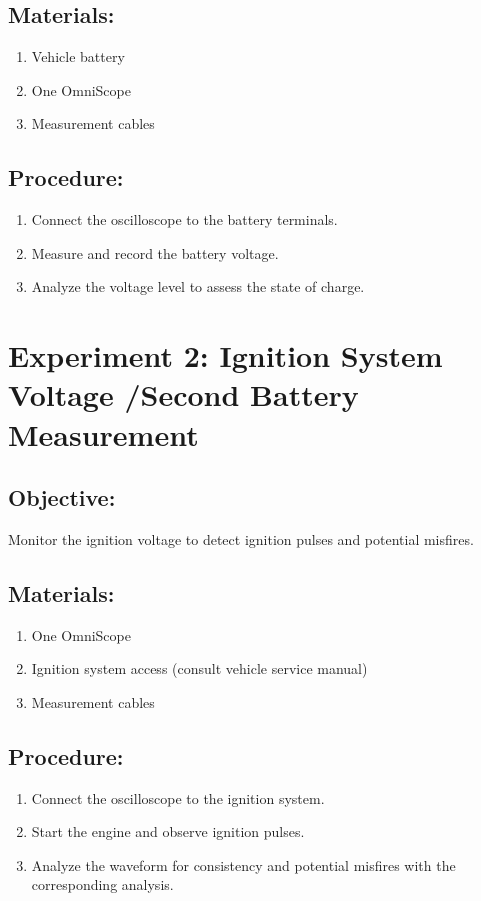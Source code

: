 \documentclass{scrreprt}
\begin{document}
\subsection*{Materials:}
\begin{enumerate}
    \item Vehicle battery
    \item One OmniScope
    \item Measurement cables
\end{enumerate}
\subsection*{Procedure:}
\begin{enumerate}
    \item Connect the oscilloscope to the battery terminals.
    \item Measure and record the battery voltage.
    \item Analyze the voltage level to assess the state of charge.
\end{enumerate}

\section*{Experiment 2: Ignition System Voltage /Second Battery Measurement}
\subsection*{Objective:} Monitor the ignition voltage to detect ignition pulses and potential misfires.
\subsection*{Materials:}
\begin{enumerate}
    \item One OmniScope
    \item Ignition system access (consult vehicle service manual)
    \item Measurement cables
\end{enumerate}
\subsection*{Procedure:}
\begin{enumerate}
    \item Connect the oscilloscope to the ignition system.
    \item Start the engine and observe ignition pulses.
    \item Analyze the waveform for consistency and potential misfires with the corresponding analysis.
\end{enumerate}
\end{document}
